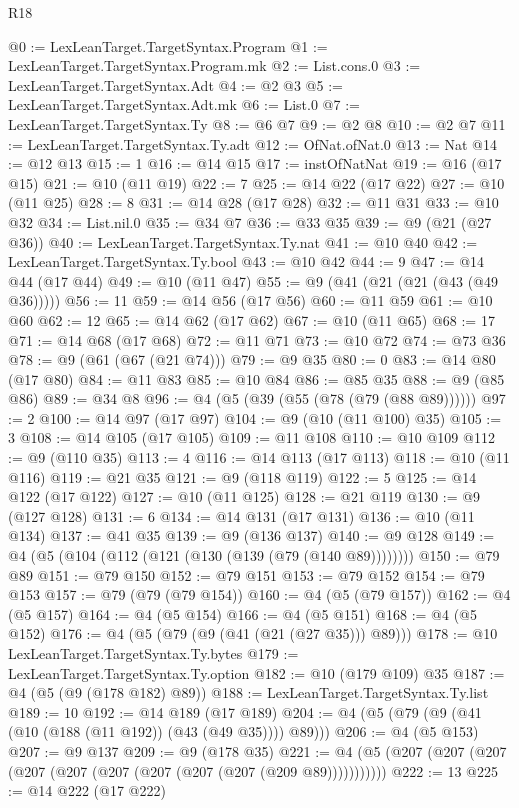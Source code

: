 \begin{lexlean}{R18}
\begin{coremodule}
{{{{{{{{{{{{{{{{{{{{{{{{{{{{{{{{{{{{{{{{{{{{{{{{{{{{{{{{{{{{{{{{{{{{{{{{{{{{{{{{{{{{{{{{{{{{{{{{{{{{{{{{{{{{{@0 := LexLeanTarget.TargetSyntax.Program
@1 := LexLeanTarget.TargetSyntax.Program.mk
@2 := List.cons.{0}
@3 := LexLeanTarget.TargetSyntax.Adt
@4 := @2 @3
@5 := LexLeanTarget.TargetSyntax.Adt.mk
@6 := List.{0}
@7 := LexLeanTarget.TargetSyntax.Ty
@8 := @6 @7
@9 := @2 @8
@10 := @2 @7
@11 := LexLeanTarget.TargetSyntax.Ty.adt
@12 := OfNat.ofNat.{0}
@13 := Nat
@14 := @12 @13
@15 := 1
@16 := @14 @15
@17 := instOfNatNat
@19 := @16 (@17 @15)
@21 := @10 (@11 @19)
@22 := 7
@25 := @14 @22 (@17 @22)
@27 := @10 (@11 @25)
@28 := 8
@31 := @14 @28 (@17 @28)
@32 := @11 @31
@33 := @10 @32
@34 := List.nil.{0}
@35 := @34 @7
@36 := @33 @35
@39 := @9 (@21 (@27 @36))
@40 := LexLeanTarget.TargetSyntax.Ty.nat
@41 := @10 @40
@42 := LexLeanTarget.TargetSyntax.Ty.bool
@43 := @10 @42
@44 := 9
@47 := @14 @44 (@17 @44)
@49 := @10 (@11 @47)
@55 := @9 (@41 (@21 (@21 (@43 (@49 @36)))))
@56 := 11
@59 := @14 @56 (@17 @56)
@60 := @11 @59
@61 := @10 @60
@62 := 12
@65 := @14 @62 (@17 @62)
@67 := @10 (@11 @65)
@68 := 17
@71 := @14 @68 (@17 @68)
@72 := @11 @71
@73 := @10 @72
@74 := @73 @36
@78 := @9 (@61 (@67 (@21 @74)))
@79 := @9 @35
@80 := 0
@83 := @14 @80 (@17 @80)
@84 := @11 @83
@85 := @10 @84
@86 := @85 @35
@88 := @9 (@85 @86)
@89 := @34 @8
@96 := @4 (@5 (@39 (@55 (@78 (@79 (@88 @89))))))
@97 := 2
@100 := @14 @97 (@17 @97)
@104 := @9 (@10 (@11 @100) @35)
@105 := 3
@108 := @14 @105 (@17 @105)
@109 := @11 @108
@110 := @10 @109
@112 := @9 (@110 @35)
@113 := 4
@116 := @14 @113 (@17 @113)
@118 := @10 (@11 @116)
@119 := @21 @35
@121 := @9 (@118 @119)
@122 := 5
@125 := @14 @122 (@17 @122)
@127 := @10 (@11 @125)
@128 := @21 @119
@130 := @9 (@127 @128)
@131 := 6
@134 := @14 @131 (@17 @131)
@136 := @10 (@11 @134)
@137 := @41 @35
@139 := @9 (@136 @137)
@140 := @9 @128
@149 := @4 (@5 (@104 (@112 (@121 (@130 (@139 (@79 (@140 @89))))))))
@150 := @79 @89
@151 := @79 @150
@152 := @79 @151
@153 := @79 @152
@154 := @79 @153
@157 := @79 (@79 (@79 @154))
@160 := @4 (@5 (@79 @157))
@162 := @4 (@5 @157)
@164 := @4 (@5 @154)
@166 := @4 (@5 @151)
@168 := @4 (@5 @152)
@176 := @4 (@5 (@79 (@9 (@41 (@21 (@27 @35))) @89)))
@178 := @10 LexLeanTarget.TargetSyntax.Ty.bytes
@179 := LexLeanTarget.TargetSyntax.Ty.option
@182 := @10 (@179 @109) @35
@187 := @4 (@5 (@9 (@178 @182) @89))
@188 := LexLeanTarget.TargetSyntax.Ty.list
@189 := 10
@192 := @14 @189 (@17 @189)
@204 := @4 (@5 (@79 (@9 (@41 (@10 (@188 (@11 @192)) (@43 (@49 @35)))) @89)))
@206 := @4 (@5 @153)
@207 := @9 @137
@209 := @9 (@178 @35)
@221 := @4 (@5 (@207 (@207 (@207 (@207 (@207 (@207 (@207 (@207 (@207 (@209 @89)))))))))))
@222 := 13
@225 := @14 @222 (@17 @222)
}}}}}}}}}}}}}}}}}}}}}}}}}}}}}}}}}}}}}}}}}}}}}}}}}}}}}}}}}}}}}}}}}}}}}}}}}}}}}}}}}}}}}}}}}}}}}}}}}}}}}}}}}}}}}
\end{coremodule}
\end{lexlean}
